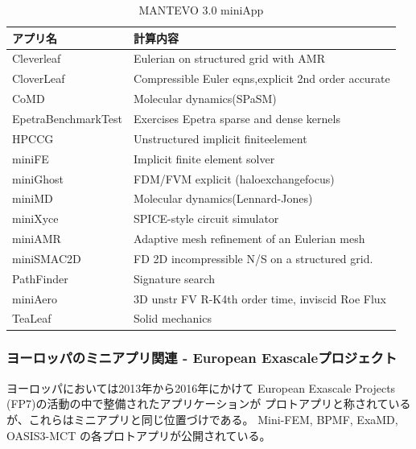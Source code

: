 \begin{table}[H]
\caption{MANTEVO 3.0 miniApp}
\label{tab:MANTEVO-miniapp}
{
\begin{tabular}{p{50mm}|p{100mm}} \hline
アプリ名		&	計算内容 \\ \hline

Cleverleaf 	&	Eulerian on structured grid with AMR  \\ \hline
CloverLeaf 	&	Compressible Euler eqns,explicit 2nd order accurate \\ \hline
CoMD 		&	Molecular dynamics(SPaSM)  \\ \hline
EpetraBenchmarkTest	&	Exercises Epetra sparse and dense kernels \\ \hline
HPCCG 		&	Unstructured implicit finiteelement  \\ \hline
miniFE 		&	Implicit finite element solver \\ \hline
miniGhost 	&	FDM/FVM explicit (haloexchangefocus) \\ \hline
miniMD 		&	Molecular dynamics(Lennard-Jones)  \\ \hline
miniXyce 	&	SPICE-style circuit simulator \\ \hline
miniAMR 		&	Adaptive mesh refinement of an Eulerian mesh \\ \hline
miniSMAC2D 	&	FD 2D incompressible N/S on a structured grid. \\ \hline
PathFinder 	&	Signature search \\ \hline
miniAero 	&	3D unstr FV R-K4th order time, inviscid Roe Flux \\ \hline
TeaLeaf 	&	Solid mechanics \\ \hline
\end{tabular}
}
\end{table}


\subsubsection{ヨーロッパのミニアプリ関連 - European Exascaleプロジェクト}
ヨーロッパにおいては2013年から2016年にかけて
European Exascale Projects (FP7)の活動の中で整備されたアプリケーションが
プロトアプリと称されているが、これらはミニアプリと同じ位置づけである。
Mini-FEM, BPMF, ExaMD, OASIS3-MCT の各プロトアプリが公開されている。
\cite{EXA2CT}

